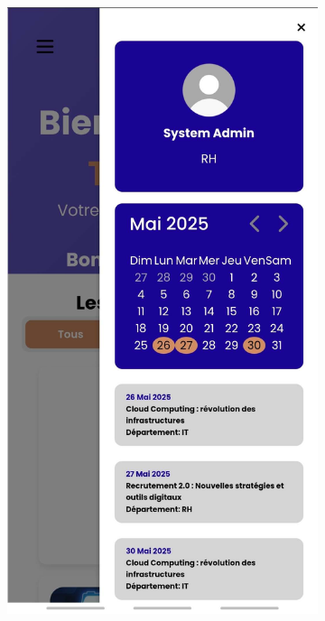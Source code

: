 \documentclass{article}
\begin{document}
\begin{figure}[H]
  \centering
  \begin{subfigure}[t]{0.3\textwidth}
    \centering
    \includegraphics[width=\textwidth]{picres4.jpg}
    \label{fig:gmail}
  \end{subfigure}
  \hspace{1cm}

\end{figure}
\end{document}
